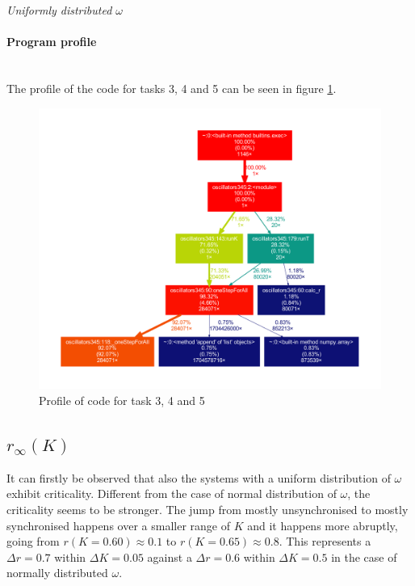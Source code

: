 \documentclass[11pt,a4paper]{article}
\newcommand{\para}[1]{\paragraph{#1}\mbox{}\\}
\begin{document}
\clearpage
\bigskip\noindent
{\Large\textit{Uniformly distributed $\omega$}}



\para{Program profile}
The profile of the code for tasks 3, 4 and 5 can be seen in figure \ref{profile345}.
\begin{figure}[h]
	\centering
	\includegraphics[width=\textwidth]{graphics/profile345.pdf} %
	\vspace{-15mm}
	\caption{Profile of code for task 3, 4 and 5}
	\label{profile345}
\end{figure}

\subsection{$r_{\infty}(K)$}

It can firstly be observed that also the systems with a uniform distribution of $\omega$ exhibit criticality. 
Different from the case of normal distribution of $\omega$, the criticality seems to be stronger. 
The jump from mostly unsynchronised to mostly synchronised happens over a smaller range of $K$ and it happens more abruptly, going from $r(K=0.60) \approx 0.1$ to $r(K=0.65) \approx 0.8$.
This represents a $\Delta r = 0.7$ within $\Delta K = 0.05$ against a $\Delta r = 0.6$ within $\Delta K = 0.5$ in the case of normally distributed $\omega$.
\end{document}
